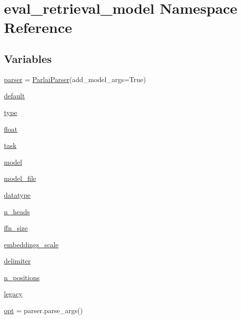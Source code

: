 \hypertarget{namespaceeval__retrieval__model}{}\section{eval\+\_\+retrieval\+\_\+model Namespace Reference}
\label{namespaceeval__retrieval__model}
\subsection*{Variables}
\begin{DoxyCompactItemize}
\item 
\hyperlink{namespaceeval__retrieval__model_a7f95ba8d39c8bbf9f0104be63a1fc6e9}{parser} = \hyperlink{classparlai_1_1core_1_1params_1_1ParlaiParser}{Parlai\+Parser}(add\+\_\+model\+\_\+args=True)
\item 
\hyperlink{namespaceeval__retrieval__model_a37ac8d364d6e0159ea9588a8d398a141}{default}
\item 
\hyperlink{namespaceeval__retrieval__model_a4ed2cb3156a9ac001bf3bba5f720ffa6}{type}
\item 
\hyperlink{namespaceeval__retrieval__model_ad11aeb88ecc754177b2673afbbf8a68c}{float}
\item 
\hyperlink{namespaceeval__retrieval__model_ac89ec4dbae0a9d01653e4b28c847505e}{task}
\item 
\hyperlink{namespaceeval__retrieval__model_ade3b5fc2f6b9f0ee4e59f9d77a4e1a7e}{model}
\item 
\hyperlink{namespaceeval__retrieval__model_ad8a6b78eb7de1f909831e09e0baa90a4}{model\+\_\+file}
\item 
\hyperlink{namespaceeval__retrieval__model_af93efafcecc149848b2614641fb6b854}{datatype}
\item 
\hyperlink{namespaceeval__retrieval__model_a3d26f6b16f3702179325b13fe1eb2943}{n\+\_\+heads}
\item 
\hyperlink{namespaceeval__retrieval__model_a46293e12c39b8962395e102567c403e9}{ffn\+\_\+size}
\item 
\hyperlink{namespaceeval__retrieval__model_a25a297eef1e8408ea10893fe9722e09c}{embeddings\+\_\+scale}
\item 
\hyperlink{namespaceeval__retrieval__model_ada0f695ee071498b168f190d6b50a1a4}{delimiter}
\item 
\hyperlink{namespaceeval__retrieval__model_aefd3b530525f81a145c28ecf885b3562}{n\+\_\+positions}
\item 
\hyperlink{namespaceeval__retrieval__model_a4734fb2a9a28ae5ee89f89550a6487da}{legacy}
\item 
\hyperlink{namespaceeval__retrieval__model_a73dfea10f7d1bae03058e230ace44590}{opt} = parser.\+parse\+\_\+args()
\end{DoxyCompactItemize}


